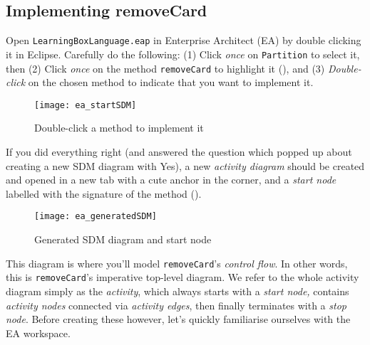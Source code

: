 \newpage
\hypertarget{remCard vis}{}
\subsection{Implementing removeCard}
\genHeader

\begin{stepbystep}

\item Open \texttt{LearningBoxLanguage.eap} in Enterprise Architect (EA) by dou\-ble clicking it in Eclipse. Carefully do the
following: (1) Click \emph{once} on \texttt{Partition} to select it, then (2) Click \emph{once} on the method \texttt{removeCard} to highlight it
(), and (3) \emph{Double-click} on the chosen method to indicate that you want to implement it.

\begin{figure}[htp]
\begin{center}
  \texttt{[image: ea\_startSDM]}
  \caption{Double-click a method to implement it}  
  \label{ea:sdm_start}
\end{center}
\end{figure}
 
\item If you did everything right (and answered the question which popped up about creating a new SDM diagram with Yes), a new \emph{activity diagram} should be created and opened in a new tab with a cute anchor in
the corner, and a \emph{start node} labelled with the signature of the method ().  

\begin{figure}[htp]
\begin{center}
 \texttt{[image: ea\_generatedSDM]}
  \caption{Generated SDM diagram and start node}  
  \label{ea:sdm_skeleton}
\end{center}
\end{figure}

\vspace{0.5cm}

\item This diagram is where you'll model \texttt{removeCard}'s \emph{control flow}. In other words,
this is \texttt{removeCard}'s imperative top-level diagram. We refer to the whole activity diagram simply as the \emph{activity}, which always starts with a
\emph{start node,} contains \emph{activity nodes} connected via \emph{activity edges}, then finally terminates with a \emph{stop node}. Before creating
these however, let's quickly familiarise ourselves with the EA workspace.


\end{stepbystep}
